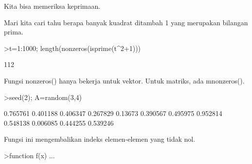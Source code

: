 \documentclass[a4paper,10pt]{article}
\begin{document}
\begin{eulernotebook}
\begin{eulercomment}
\begin{eulercomment}
\begin{eulercomment}
\begin{eulercomment}
\begin{eulercomment}
\begin{eulercomment}
\begin{eulercomment}
\begin{eulercomment}
\begin{eulercomment}
\begin{eulercomment}
\begin{eulercomment}
\begin{eulercomment}
\begin{eulercomment}
\begin{eulercomment}
\begin{eulercomment}
\begin{eulercomment}
\begin{eulercomment}
Kita bisa memeriksa keprimaan.

Mari kita cari tahu berapa banyak kuadrat ditambah 1 yang merupakan
bilangan prima.
\end{eulercomment}
\begin{eulerprompt}
>t=1:1000; length(nonzeros(isprime(t^2+1)))
\end{eulerprompt}
\begin{euleroutput}
  112
\end{euleroutput}
\begin{eulercomment}
Fungsi nonzeros() hanya bekerja untuk vektor. Untuk matriks, ada
mnonzeros().
\end{eulercomment}
\begin{eulerprompt}
>seed(2); A=random(3,4)
\end{eulerprompt}
\begin{euleroutput}
       0.765761      0.401188      0.406347      0.267829 
        0.13673      0.390567      0.495975      0.952814 
       0.548138      0.006085      0.444255      0.539246 
\end{euleroutput}
\begin{eulercomment}
Fungsi ini mengembalikan indeks elemen-elemen yang tidak nol.
\end{eulercomment}
\begin{eulerprompt}
>function f(x) ...
\end{eulerprompt}
\begin{eulerudf}
  

\end{eulerudf}
\end{eulercomment}
\end{eulercomment}
\end{eulercomment}
\end{eulercomment}
\end{eulercomment}
\end{eulercomment}
\end{eulercomment}
\end{eulercomment}
\end{eulercomment}
\end{eulercomment}
\end{eulercomment}
\end{eulercomment}
\end{eulercomment}
\end{eulercomment}
\end{eulercomment}
\end{eulercomment}
\end{eulernotebook}
\end{document}
